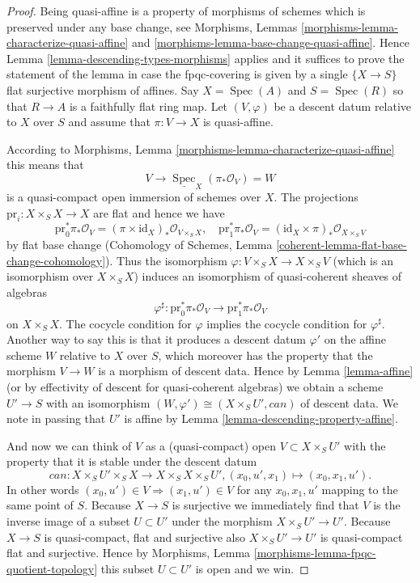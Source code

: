 \documentclass{stacks-project}
\theoremstyle{plain}
\theoremstyle{definition}
\theoremstyle{remark}
\numberwithin{equation}{subsection}
\def\Spec{\mathop{\mathrm{Spec}}}
\begin{document}
\begin{proof}
Being quasi-affine is a property of morphisms of schemes
which is preserved under any base change, see
Morphisms, Lemmas \ref{morphisms-lemma-characterize-quasi-affine} and
\ref{morphisms-lemma-base-change-quasi-affine}.
Hence Lemma \ref{lemma-descending-types-morphisms} applies
and it suffices to prove the statement of the lemma
in case the fpqc-covering is given by a single
$\{X \to S\}$ flat surjective morphism of affines.
Say $X = \Spec(A)$ and $S = \Spec(R)$ so
that $R \to A$ is a faithfully flat ring map.
Let $(V, \varphi)$ be a descent datum relative to $X$ over $S$
and assume that $\pi : V \to X$ is quasi-affine.

\medskip\noindent
According to Morphisms, Lemma \ref{morphisms-lemma-characterize-quasi-affine}
this means that
$$
V \longrightarrow \underline{\Spec}_X(\pi_*\mathcal{O}_V) = W
$$
is a quasi-compact open immersion of schemes over $X$.
The projections $\text{pr}_i : X \times_S X \to X$ are flat
and hence we have
$$
\text{pr}_0^*\pi_*\mathcal{O}_V =
(\pi \times \text{id}_X)_*\mathcal{O}_{V \times_S X}, \quad
\text{pr}_1^*\pi_*\mathcal{O}_V =
(\text{id}_X \times \pi)_*\mathcal{O}_{X \times_S V}
$$
by flat base change
(Cohomology of Schemes, Lemma \ref{coherent-lemma-flat-base-change-cohomology}).
Thus the isomorphism $\varphi : V \times_S X \to X \times_S V$ (which
is an isomorphism over $X \times_S X$) induces an isomorphism
of quasi-coherent sheaves of algebras
$$
\varphi^\sharp :
\text{pr}_0^*\pi_*\mathcal{O}_V
\longrightarrow
\text{pr}_1^*\pi_*\mathcal{O}_V
$$
on $X \times_S X$.
The cocycle condition for $\varphi$ implies the cocycle condition
for $\varphi^\sharp$. Another way to say this is that it produces
a descent datum $\varphi'$ on the affine scheme $W$ relative to
$X$ over $S$, which moreover has the property that the morphism
$V \to W$ is a morphism of descent data.
Hence by Lemma \ref{lemma-affine}
(or by effectivity of descent for quasi-coherent
algebras) we obtain a scheme $U' \to S$ with an isomorphism
$(W, \varphi') \cong (X \times_S U', can)$ of descent data.
We note in passing that $U'$ is affine by
Lemma \ref{lemma-descending-property-affine}.

\medskip\noindent
And now we can think of $V$ as a (quasi-compact)
open $V \subset X \times_S U'$ with the property that
it is stable under the descent datum
$$
can : X \times_S U' \times_S X \to X \times_S X \times_S U',
(x_0, u', x_1) \mapsto (x_0, x_1, u').
$$
In other words $(x_0, u') \in V \Rightarrow (x_1, u') \in V$
for any $x_0, x_1, u'$ mapping to the same point of $S$.
Because $X \to S$ is surjective we immediately find that
$V$ is the inverse image of a subset $U \subset U'$ under
the morphism $X \times_S U' \to U'$.
Because $X \to S$ is quasi-compact, flat and surjective
also $X \times_S U' \to U'$ is quasi-compact flat and surjective.
Hence by Morphisms, Lemma \ref{morphisms-lemma-fpqc-quotient-topology}
this subset $U \subset U'$ is open and we win.
\end{proof}
\end{document}
